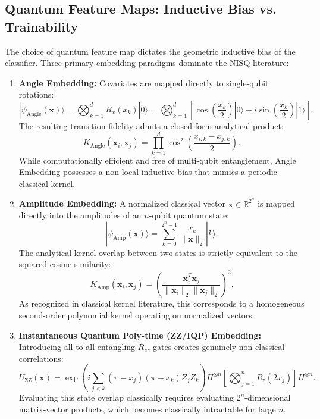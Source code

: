 \documentclass[journal,twocolumn]{IEEEtran}
\begin{document}
\subsection{Quantum Feature Maps: Inductive Bias vs. Trainability}
The choice of quantum feature map dictates the geometric inductive bias of the classifier. Three primary embedding paradigms dominate the NISQ literature:
\begin{enumerate}
    \item \textbf{Angle Embedding:} Covariates are mapped directly to single-qubit rotations:
    \begin{equation}
    |\psi_{\text{Angle}}(\mathbf{x})\rangle = \bigotimes_{k=1}^d R_x(x_k)|0\rangle = \bigotimes_{k=1}^d \left[\cos\left(\frac{x_k}{2}\right)|0\rangle - i\sin\left(\frac{x_k}{2}\right)|1\rangle\right].
    \end{equation}
    The resulting transition fidelity admits a closed-form analytical product:
    \begin{equation}
    K_{\text{Angle}}(\mathbf{x}_i, \mathbf{x}_j) = \prod_{k=1}^d \cos^2\left(\frac{x_{i,k} - x_{j,k}}{2}\right).
    \label{eq:angle_analytical}
    \end{equation}
    While computationally efficient and free of multi-qubit entanglement, Angle Embedding possesses a non-local inductive bias that mimics a periodic classical kernel.
    \item \textbf{Amplitude Embedding:} A normalized classical vector $\mathbf{x} \in \mathbb{R}^{2^n}$ is mapped directly into the amplitudes of an $n$-qubit quantum state:
    \begin{equation}
    |\psi_{\text{Amp}}(\mathbf{x})\rangle = \sum_{k=0}^{2^n-1} \frac{x_k}{\|\mathbf{x}\|_2} |k\rangle.
    \end{equation}
    The analytical kernel overlap between two states is strictly equivalent to the squared cosine similarity:
    \begin{equation}
    K_{\text{Amp}}(\mathbf{x}_i, \mathbf{x}_j) = \left(\frac{\mathbf{x}_i^T \mathbf{x}_j}{\|\mathbf{x}_i\|_2 \|\mathbf{x}_j\|_2}\right)^2.
    \label{eq:amp_analytical}
    \end{equation}
    As recognized in classical kernel literature, this corresponds to a homogeneous second-order polynomial kernel operating on normalized vectors.
    \item \textbf{Instantaneous Quantum Poly-time (ZZ/IQP) Embedding:} Introducing all-to-all entangling $R_{zz}$ gates creates genuinely non-classical correlations:
    \begin{equation}
    U_{\text{ZZ}}(\mathbf{x}) = \exp\left(i \sum_{j < k} (\pi - x_j)(\pi - x_k) Z_j Z_k\right) H^{\otimes n} \left[\bigotimes_{j=1}^n R_z(2 x_j)\right] H^{\otimes n}.
    \label{eq:zz_circuit_math}
    \end{equation}
    Evaluating this state overlap classically requires evaluating $2^n$-dimensional matrix-vector products, which becomes classically intractable for large $n$.
\end{enumerate}
\end{document}
